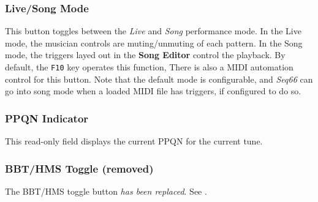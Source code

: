 \subsubsection{Live/Song Mode}
\label{subsubsec:introduction_livesong_mode_button}

   This button toggles between the \textsl{Live} and \textsl{Song} performance
   mode. In the Live mode, the musician controls are muting/unmuting of each
   pattern.  In the Song mode, the triggers layed out in the
   \textbf{Song Editor} control the playback.
   By default, the \texttt{F10} key operates this function,
   There is also a MIDI automation control for this button.
   Note that the default mode is configurable, and \textsl{Seq66} can go into
   song mode when a loaded MIDI file has triggers, if configured to do so.

\subsubsection{PPQN Indicator}
\label{subsubsec:introduction_ppqn_indicator}

   This read-only field displays the current PPQN for the current tune.


\subsubsection{BBT/HMS Toggle (removed)}
\label{subsubsec:introduction_time_format_toggle_button}

   The BBT/HMS toggle button \textsl{has been replaced}.
   See .


